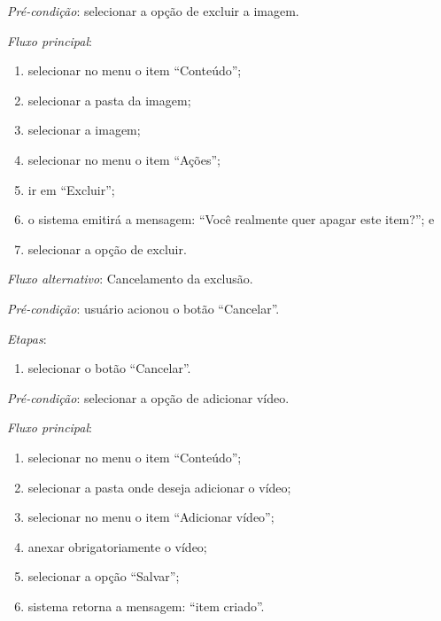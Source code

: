 \documentclass[a4paper,12pt]{article}
\begin{document}
\vspace{0.7cm}

\noindent \textit{Pré-condição}: selecionar a opção de excluir a imagem.

\noindent \textit{Fluxo principal}:

\begin{enumerate}
    \item selecionar no menu o item ``Conteúdo'';
    \item selecionar a pasta da imagem;
    \item selecionar a imagem;
    \item selecionar no menu o item ``Ações'';
    \item ir em ``Excluir'';
    \item o sistema emitirá a mensagem: ``Você realmente quer apagar este item?''; e
    \item selecionar a opção de excluir.
\end{enumerate}

\noindent \textit{Fluxo alternativo}: Cancelamento da exclusão.

\noindent \textit{Pré-condição}: usuário acionou o botão ``Cancelar''.

\noindent \textit{Etapas}:

\begin{enumerate}
    \item selecionar o botão ``Cancelar''.
\end{enumerate}


\vspace{0.7cm}

\noindent \textit{Pré-condição}: selecionar a opção de adicionar vídeo.

\noindent \textit{Fluxo principal}:

\begin{enumerate}
    \item selecionar no menu o item ``Conteúdo'';
    \item selecionar a pasta onde deseja adicionar o vídeo;
    \item selecionar no menu o item ``Adicionar vídeo'';
    \item anexar obrigatoriamente o vídeo;
    \item selecionar a opção ``Salvar'';
    \item sistema retorna a mensagem: ``item criado''.
\end{enumerate}
\end{document}
